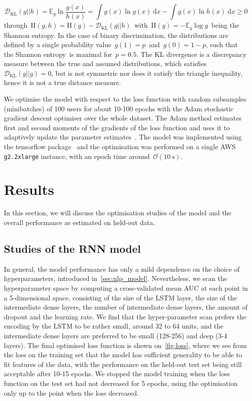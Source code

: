\begin{equation}
\mathcal{D}_{\mathrm{KL}}(g||h) = \mathbb{E}_g \ln{\frac{g(x)}{h(x)}} = \int g(x) \ln{g(x)}\ \mathrm{d}x - \int g(x) \ln{h(x)}\ \mathrm{d}x \geq 0
\end{equation}
through~$\mathrm{H}(g,h) = \mathrm{H}(g) - \mathcal{D}_{\mathrm{KL}}(g||h)$~with~$\mathrm{H}(g) = -\mathbb{E}_g \log{g}$~being the Shannon entropy. In the case of binary discrimination, the distributions are defined by a single probability value~$g(1) = p$~and~$g(0) = 1 - p$, such that the Shannon entropy is maximal for~$p=0.5$. The KL divergence is a discrepancy measure between the true and assumed distributions, which satisfies~$\mathcal{D}_{\mathrm{KL}}(g||g) = 0$, but is not symmetric nor does it satisfy the triangle inequality, hence it is not a true distance measure.

We optimise the model with respect to the loss function with random subsamples (minibatches) of 100 users for about 10-100 epochs with the Adam stochastic gradient descent optimiser over the whole dataset. The Adam method estimates first and second moments of the gradients of the loss function and uses it to adaptively update the parameter estimates~\cite{DBLP:journals/corr/KingmaB14}. The model was implemented using the tensorflow package~\cite{2016arXiv160304467A} and the optimisation was performed on a single AWS \texttt{g2.2xlarge} instance, with an epoch time around~$\mathcal{O}(10~\mathrm{s})$.

\section{Results}
\label{sec:lingvist_results}
In this section, we will discuss the optimisation studies of the model and the overall performance as estimated on held-out data.

\subsection{Studies of the RNN model}
In general, the model performance has only a mild dependence on the choice of hyperparameters, introduced in~\cref{sec:nlp_model}. Nevertheless, we scan the hyperparameter space by computing a cross-validated mean AUC at each point in a 5-dimensional space, consisting of the size of the LSTM layer, the size of the intermediate dense layers, the number of intermediate dense layers, the amount of dropout and the learning rate. We find that the hyper-parameter scan prefers the encoding by the LSTM to be rather small, around 32 to 64 units, and the intermediate dense layers are preferred to be small (128-256) and deep (3-4 layers). The final optimised loss function is shown on~\cref{fig:loss}, where we see from the loss on the training set that the model has sufficient generality to be able to fit features of the data, with the performance on the held-out test set being still acceptable after 10-15 epochs. We stopped the model training when the loss function on the test set had not decreased for 5 epochs, using the optimisation only up to the point when the loss decreased. 

